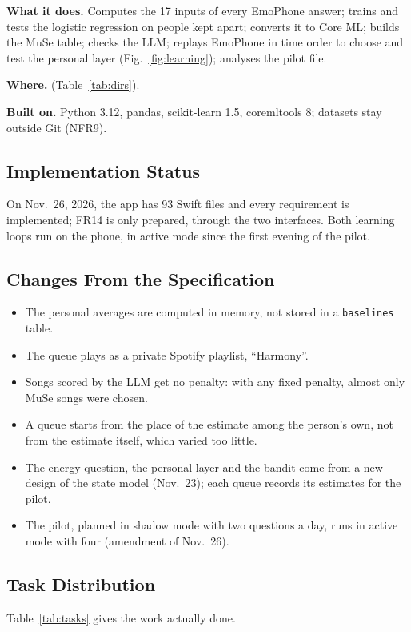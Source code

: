 \documentclass[conference]{IEEEtran}
\newcommand{\field}[1]{\noindent\textbf{#1}}
\begin{document}
\field{What it does.} Computes the 17 inputs of every EmoPhone answer; trains and tests the logistic regression on people kept apart; converts it to Core ML; builds the MuSe table; checks the LLM; replays EmoPhone in time order to choose and test the personal layer (Fig.~\ref{fig:learning}); analyses the pilot file.

\field{Where.}  (Table~\ref{tab:dirs}).

\field{Built on.} Python 3.12, pandas, scikit-learn 1.5, coremltools 8; datasets stay outside Git (NFR9).

\subsection{Implementation Status}\label{sec:status}
On Nov.\ 26, 2026, the app has 93 Swift files and every requirement is implemented; FR14 is only prepared, through the two interfaces. Both learning loops run on the phone, in active mode since the first evening of the pilot.

\subsection{Changes From the Specification}\label{sec:changes}
\begin{itemize}
\item The personal averages are computed in memory, not stored in a \texttt{baselines} table.
\item The queue plays as a private Spotify playlist, ``Harmony''.
\item Songs scored by the LLM get no penalty: with any fixed penalty, almost only MuSe songs were chosen.
\item A queue starts from the place of the estimate among the person's own, not from the estimate itself, which varied too little.
\item The energy question, the personal layer and the bandit come from a new design of the state model (Nov.\ 23); each queue records its estimates for the pilot.
\item The pilot, planned in shadow mode with two questions a day, runs in active mode with four (amendment of Nov.\ 26).
\end{itemize}

\subsection{Task Distribution}\label{sec:tasks}
Table~\ref{tab:tasks} gives the work actually done.
\end{document}
